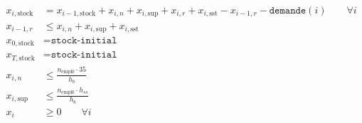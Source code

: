 \documentclass[12pt,oneside,a4paper]{article}
\begin{document}
\begin{align*}
  x_{i,\text{stock}} &= x_{i-1,\text{stock}} + x_{i,n} + x_{i,\text{sup}} 
  + x_{i,r} + x_{i,\text{sst}} - x_{i-1,r} - \texttt{demande}(i) \qquad \forall i \\
  x_{i-1,r} &\leq  x_{i,n} + x_{i,\text{sup}} + x_{i,\text{sst}} \\
  x_{0,\text{stock}} &= \texttt{stock-initial} \\
  x_{T,\text{stock}} &= \texttt{stock-initial} \\
  x_{i,n} &\leq \frac{n_{\text{empl0}} \cdot 35}{h_b} \\
  x_{i,\text{sup}} &\leq \frac{n_{\text{empl0}} \cdot h_{ss}}{h_{b}} \\
  x_i &\geq 0 \qquad \forall i \\
\end{align*}
\end{document}
